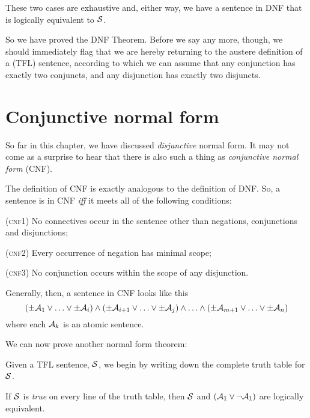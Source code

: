 	These two cases are exhaustive and, either way, we have a sentence in DNF that is logically equivalent to $\mathcal{S}$.

So we have proved the DNF Theorem. Before we say any more, though, we should immediately flag that we are hereby returning to the austere definition of a (TFL) sentence, according to which we can assume that any conjunction has exactly two conjuncts, and any disjunction has exactly two disjuncts.


\section{Conjunctive normal form}
\label{s:CNF}

So far in this chapter, we have discussed \emph{disjunctive} normal form. It may not come as a surprise to hear that there is also such a thing as \emph{conjunctive normal form} (CNF).

The definition of CNF is exactly analogous to the definition of DNF. So, a sentence is in CNF \emph{iff} it meets all of the following conditions:
	\begin{earg}
		\item[(\textsc{cnf1})] No connectives occur in the sentence other than negations, conjunctions and disjunctions;
		\item[(\textsc{cnf2})] Every occurrence of negation has minimal scope;
		\item[(\textsc{cnf3})] No conjunction occurs within the scope of any disjunction.
	\end{earg}
Generally, then, a sentence in CNF looks like this
	$$(\pm \mathcal{A}_1 \lor \ldots \lor \pm \mathcal{A}_i) \land (\pm \mathcal{A}_{i+1} \lor \ldots \lor \pm\mathcal{A}_j) \land \ldots \land (\pm\mathcal{A}_{m+1} \lor\ldots \lor \pm \mathcal{A}_n)$$
where each $\mathcal{A}_k$ is an atomic sentence.

We can now prove another normal form theorem:

        
	Given a TFL sentence, $\mathcal{S}$, we begin by writing down the complete truth table for $\mathcal{S}$.
	
	If $\mathcal{S}$ is \emph{true} on every line of the truth table, then $\mathcal{S}$ and $(\mathcal{A}_1 \vee \neg \mathcal{A}_1)$ are logically equivalent.
	
